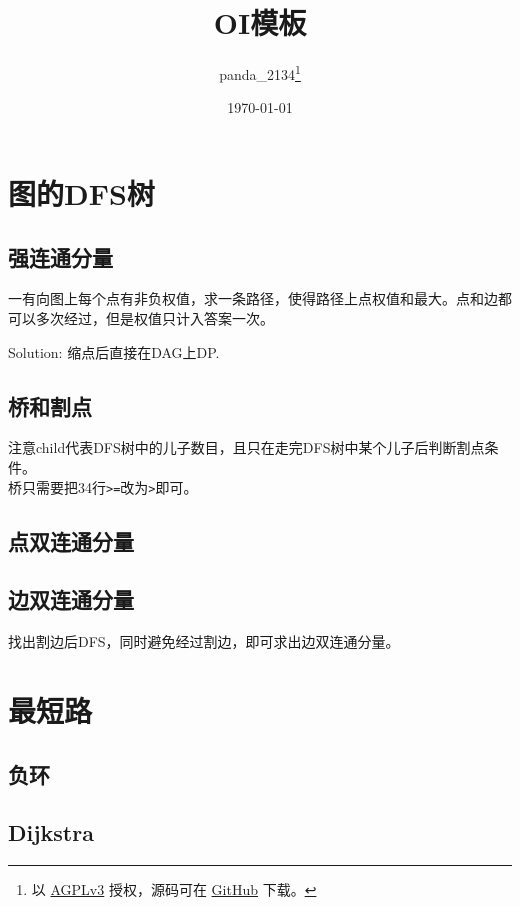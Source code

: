 \documentclass{article}
\title{OI模板}
\author{panda\_2134\footnote{以 \href{https://www.gnu.org/licenses/agpl-3.0.txt}{AGPLv3} 授权，源码可在 \href{https://github.com/panda2134/OITemplate}{GitHub} 下载。}}
\date{\today}
\begin{document}
	\makeatletter
	\lst@CCPutMacro
    	\@empty\z@\@empty
	\makeatother

	\maketitle
	\newpage
	\tableofcontents
	\newpage

	\section{图的DFS树}
		\subsection{强连通分量}
		
		一有向图上每个点有非负权值，求一条路径，使得路径上点权值和最大。点和边都可以多次经过，但是权值只计入答案一次。
		
		Solution: 缩点后直接在DAG上DP.
		
		
		\subsection{桥和割点}
		注意child代表DFS树中的儿子数目，且只在走完DFS树中某个儿子后判断割点条件。\\
		桥只需要把34行\lstinline|>=|改为\lstinline|>|即可。
		

		\subsection{点双连通分量}
		

		\subsection{边双连通分量}
		找出割边后DFS，同时避免经过割边，即可求出边双连通分量。
	\newpage
	\section{最短路}
		\subsection{负环}
			
		\subsection{Dijkstra}
\end{document}
